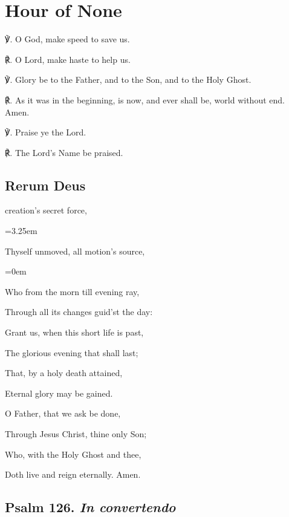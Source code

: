 \fancyhead[RE,LO]{}
\section{Hour of None}

\begin{multicols}{2}

℣. O God, {} make speed to save us.

℟. O Lord, make haste to help us.

℣. Glory be to the Father, and to the Son, and to the Holy Ghost.

℟. As it was in the beginning, is now, and ever shall be, world without end. Amen.

℣. Praise ye the Lord.

℟. The Lord's Name be praised.

\subsection{Rerum Deus}
 creation’s secret force,\par
\leftskip=3.25em
\par\noindent
Thyself unmoved, all motion's source,

\leftskip=0em

\begin{hangparas}{1.25em}{1}
\par\noindent
Who from the morn till evening ray,\par\noindent
Through all its changes guid'st the day:\\
\par\noindent
Grant us, when this short life is past,\par\noindent
The glorious evening that shall last;\par\noindent
That, by a holy death attained,\par\noindent
Eternal glory may be gained.\\
\par\noindent
O Father, that we ask be done,\par\noindent
Through Jesus Christ, thine only Son;\par\noindent
Who, with the Holy Ghost and thee,\par\noindent
Doth live and reign eternally. Amen.
\end{hangparas}

\subsection{Psalm 126. \textit{In convertendo}}


\end{multicols}
